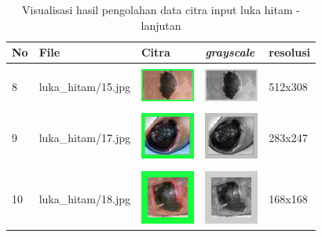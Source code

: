 \begin{table}[H]
	\centering
	\caption{Visualisasi hasil pengolahan data citra input luka hitam - lanjutan}
	\label{tabel_input_2}
	\begin{tabular}{|m{0.2in}|m{1.2in}|m{0.7in}|m{0.7in}|m{0.7in}|}
		\hline
		\textbf{No} & \textbf{File} & \textbf{Citra} & \textbf{\emph{grayscale}} & \textbf{resolusi} \\
		\hline
		
		& &  &  &\\
		8 & 
		luka\_hitam/15.jpg &
		\includegraphics[width=0.7in]{dataset/dataset_3/luka_hitam/ready/15.jpg}&
		\includegraphics[width=0.7in]{dataset/dataset_3/luka_hitam/ready/15_gray.jpg}&
		512x308\\
		\hline
		
		& &  &  &\\
		9 & 
		luka\_hitam/17.jpg &
		\includegraphics[width=0.7in]{dataset/dataset_3/luka_hitam/ready/17.jpg}&
		\includegraphics[width=0.7in]{dataset/dataset_3/luka_hitam/ready/17_gray.jpg}&
		283x247\\
		\hline
		
		& &  &  &\\
		10 & 
		luka\_hitam/18.jpg &
		\includegraphics[width=0.7in]{dataset/dataset_3/luka_hitam/ready/18.jpg}&
		\includegraphics[width=0.7in]{dataset/dataset_3/luka_hitam/ready/18_gray.jpg}&
		168x168\\
		\hline
		

\end{tabular}
\end{table}
